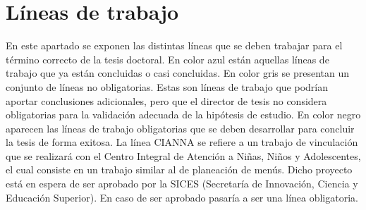 \pagebreak
\section{Líneas de trabajo}
En este apartado se exponen las distintas líneas que se deben trabajar para el término correcto de la tesis
doctoral.
%
En color azul están aquellas líneas de trabajo que ya están concluidas o casi concluidas.
%
En color gris se presentan un conjunto de líneas no obligatorias. 
%
Estas son líneas de trabajo que podrían aportar conclusiones adicionales, pero que el director de tesis
no considera obligatorias para la validación adecuada de la hipótesis de estudio.
%
En color negro aparecen las líneas de trabajo obligatorias que se deben desarrollar para concluir la tesis
de forma exitosa.
%
La línea CIANNA se refiere a un trabajo de vinculación que se realizará con el 
Centro Integral de Atención a Niñas, Niños y Adolescentes, el cual consiste en un trabajo
similar al de planeación de menús.
%
Dicho proyecto está en espera de ser aprobado por la SICES (Secretaría de Innovación, Ciencia y Educación Superior).
%
En caso de ser aprobado pasaría a ser una línea obligatoria.

